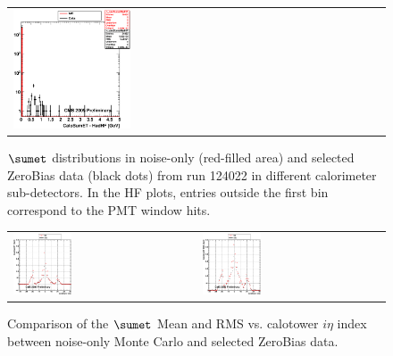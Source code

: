 \begin{figure}[h!]
\begin{tabular}{ll}
  \includegraphics[width=0.33\textwidth]{plots_CaloNoise/h_caloSumetHadHF.eps} \\
 \end{tabular}
 \caption{\small $\sumet$ distributions in noise-only (red-filled area) and selected ZeroBias data (black dots) from
run 124022 in different calorimeter sub-detectors. In the HF plots, entries outside the first bin correspond to the PMT
window hits.\label{fig:subdet_CaloSumET}}
\end{figure}

\begin{figure}[h!]
 \centering
 \begin{tabular}{ll}
  \includegraphics[width=0.33\textwidth]{plots_CaloNoise/g_caloSumetMean_vs_ieta_ZB.eps} &
  \includegraphics[width=0.33\textwidth]{plots_CaloNoise/g_caloSumetRMS_vs_ieta_ZB.eps} \\
 \end{tabular}
 \caption{\small Comparison of the $\sumet$ Mean and RMS vs. calotower $i\eta$ index between noise-only
          Monte Carlo and selected ZeroBias data.\label{fig:SumET_MeanRMS_vs_ieta_ZB}}
\end{figure}

\clearpage
